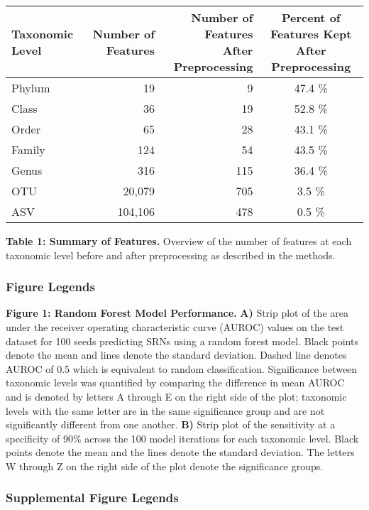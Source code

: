 \documentclass[
]{article}
\begin{document}
\begin{longtable}[]{@{}lrrc@{}}
\toprule
Taxonomic Level & Number of Features &
\makecell[c]{Number of Features \\ After Preprocessing} &
\makecell[c]{Percent of Features Kept \\ After Preprocessing} \\
\midrule
\endhead
Phylum & 19 & 9 & 47.4 \% \\
Class & 36 & 19 & 52.8 \% \\
Order & 65 & 28 & 43.1 \% \\
Family & 124 & 54 & 43.5 \% \\
Genus & 316 & 115 & 36.4 \% \\
OTU & 20,079 & 705 & 3.5 \% \\
ASV & 104,106 & 478 & 0.5 \% \\
\bottomrule
\end{longtable}

\textbf{Table 1: Summary of Features.} Overview of the number of
features at each taxonomic level before and after preprocessing as
described in the methods.

\newpage

\hypertarget{figure-legends}{%
\subsubsection{Figure Legends}\label{figure-legends}}

\textbf{Figure 1: Random Forest Model Performance.} \textbf{A)} Strip
plot of the area under the receiver operating characteristic curve
(AUROC) values on the test dataset for 100 seeds predicting SRNs using a
random forest model. Black points denote the mean and lines denote the
standard deviation. Dashed line denotes AUROC of 0.5 which is equivalent
to random classification. Significance between taxonomic levels was
quantified by comparing the difference in mean AUROC and is denoted by
letters A through E on the right side of the plot; taxonomic levels with
the same letter are in the same significance group and are not
significantly different from one another. \textbf{B)} Strip plot of the
sensitivity at a specificity of 90\% across the 100 model iterations for
each taxonomic level. Black points denote the mean and the lines denote
the standard deviation. The letters W through Z on the right side of the
plot denote the significance groups.

\newpage

\hypertarget{supplemental-figure-legends}{%
\subsubsection{Supplemental Figure
Legends}\label{supplemental-figure-legends}}
\end{document}
